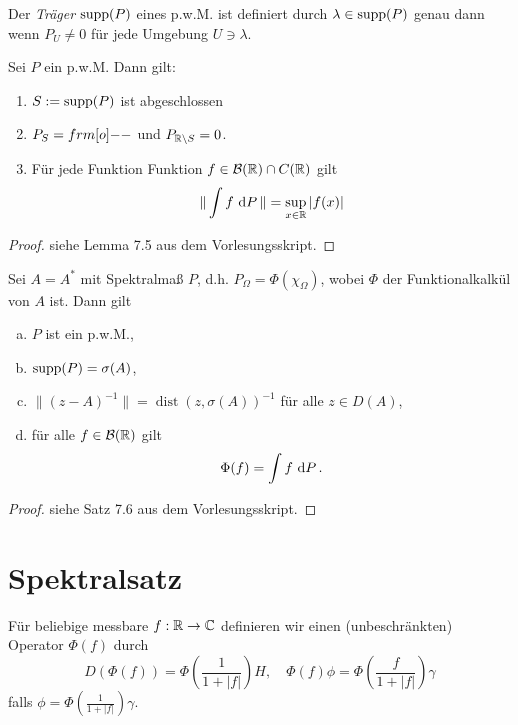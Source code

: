 \documentclass{mycourse}
\newcommand{\dist}{\operatorname{dist}}
\begin{document}
Der \emph{Träger} $\supp(P)$ eines p.w.M. ist definiert durch $\lambda \in \supp(P)$ genau dann wenn
$P_U\neq 0$ für jede Umgebung $U\ni \lambda$.
\begin{st}
Sei $P$ ein p.w.M. Dann gilt:
\begin{enumerate}
\item $S:= \supp(P)$ ist abgeschlossen
\item $P_S= \1$ und  $P_{\R \setminus S} =0$.
\item Für jede Funktion Funktion $f\in \mathcal B(\R) \cap C(\R)$ gilt
\[
\| \int f\, \dx[P]\| = \sup_{x\in \R} |f(x)|
\]
\end{enumerate}
\end{st}
\begin{proof}
siehe Lemma 7.5 aus dem Vorlesungsskript.
\end{proof}
\begin{st}
Sei $A=A^*$ mit Spektralmaß $P$, d.h. $P_\Omega= \Phi(\chi_\Omega)$, wobei $\Phi $ der Funktionalkalkül von $A$ ist. Dann gilt
\begin{enumerate}[a)]
\item $P$ ist ein p.w.M.,
\item $\supp(P) = \sigma(A)$,
\item $\| (z-A)^{-1} \| = \dist(z, \sigma(A))^{-1}$ für alle $z\in D(A)$,
\item für alle $f\in \mathcal B(\R)$ gilt
\[
\Phi(f) = \int f \, \dx[P].
\]

\end{enumerate}
\end{st}
\begin{proof}
siehe Satz 7.6 aus dem Vorlesungsskript.
\end{proof}

\section{Spektralsatz}
Für beliebige messbare $f: \R \to \C$ definieren wir einen (unbeschränkten) Operator $\Phi(f)$ durch
\begin{equation}\label{6.1}
D(\Phi(f))= \Phi(\frac{1}{1+|f|}) H, \quad \Phi(f) \phi = \Phi(\frac{f}{1+|f|}) \gamma
\end{equation}
falls $\phi = \Phi(\frac{1}{1+|f|}) \gamma$.
\end{document}
